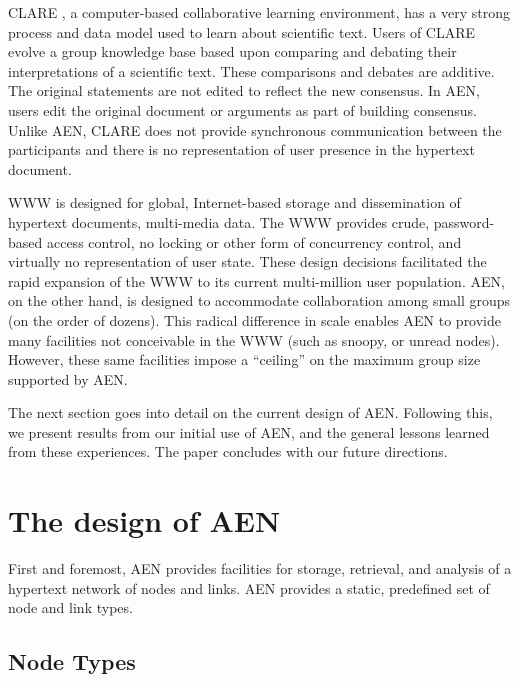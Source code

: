

CLARE \cite{csdl-93-21}, a computer-based collaborative learning
environment, has a very strong process and data model used to learn about
scientific text.  Users of CLARE evolve a group knowledge base based upon
comparing and debating their interpretations of a scientific text.  These
comparisons and debates are additive.  The original statements are not
edited to reflect the new consensus.  In AEN, users edit the original
document or arguments as part of building consensus.  Unlike AEN, CLARE
does not provide synchronous communication between the participants and
there is no representation of user presence in the hypertext document.



WWW \cite{Berners-Lee94} is designed for global, Internet-based storage and
dissemination of hypertext documents, multi-media data.  The WWW provides
crude, password-based access control, no locking or other form of
concurrency control, and virtually no representation of user state.  These
design decisions facilitated the rapid expansion of the WWW to its current
multi-million user population.  AEN, on the other hand, is designed
to accommodate collaboration among small groups (on the order of dozens).  This
radical difference in scale enables AEN to provide many facilities
not conceivable in the WWW (such as snoopy, or unread nodes).  However,
these same facilities impose a ``ceiling'' on the maximum group size
supported by AEN.


The next section goes into detail on the current design of AEN.  Following
this, we present results from our initial use of AEN, and the general
lessons learned from these experiences.  The paper concludes with our 
future directions.

\section{The design of AEN}

First and foremost, AEN provides facilities for storage, retrieval, and
analysis of a hypertext network of nodes and links.  AEN provides a static,
predefined set of node and link types.

\subsection{Node Types}

